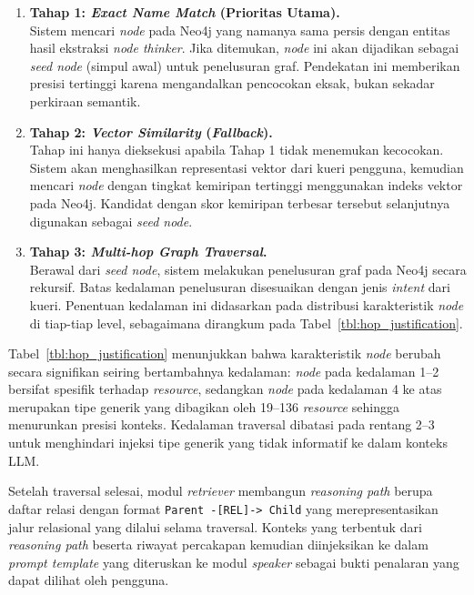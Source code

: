 \begin{enumerate}
    \item \textbf{Tahap 1: \textit{Exact Name Match} (Prioritas Utama).} \\
    Sistem mencari \textit{node} pada Neo4j yang namanya sama persis dengan entitas hasil ekstraksi 
    \textit{node thinker}. Jika ditemukan, \textit{node} ini akan dijadikan sebagai \textit{seed node} 
    (simpul awal) untuk penelusuran graf. Pendekatan ini memberikan presisi tertinggi karena 
    mengandalkan pencocokan eksak, bukan sekadar perkiraan semantik.

    \item \textbf{Tahap 2: \textit{Vector Similarity} (\textit{Fallback}).} \\
    Tahap ini hanya dieksekusi apabila Tahap 1 tidak menemukan kecocokan. Sistem akan menghasilkan 
    representasi vektor dari kueri pengguna, kemudian mencari \textit{node} dengan tingkat kemiripan 
    tertinggi menggunakan indeks vektor pada Neo4j. Kandidat dengan skor kemiripan terbesar tersebut 
    selanjutnya digunakan sebagai \textit{seed node}.

    \item \textbf{Tahap 3: \textit{Multi-hop Graph Traversal}.} \\
    Berawal dari \textit{seed node}, sistem melakukan penelusuran graf pada Neo4j secara rekursif. 
    Batas kedalaman penelusuran disesuaikan dengan jenis \textit{intent} dari kueri. Penentuan 
    kedalaman ini didasarkan pada distribusi karakteristik \textit{node} di tiap-tiap level, 
    sebagaimana dirangkum pada Tabel~\ref{tbl:hop_justification}.
\end{enumerate}



Tabel~\ref{tbl:hop_justification} menunjukkan bahwa karakteristik \textit{node} berubah secara
signifikan seiring bertambahnya kedalaman: \textit{node} pada kedalaman 1--2 bersifat spesifik
terhadap \textit{resource}, sedangkan \textit{node} pada kedalaman 4 ke atas merupakan tipe
generik yang dibagikan oleh 19--136 \textit{resource} sehingga menurunkan presisi konteks.
Kedalaman traversal dibatasi pada rentang 2--3 untuk menghindari injeksi tipe generik yang
tidak informatif ke dalam konteks LLM.

Setelah traversal selesai, modul \textit{retriever} membangun \textit{reasoning path} berupa
daftar relasi dengan format \texttt{Parent -[REL]-> Child} yang merepresentasikan jalur
relasional yang dilalui selama traversal.
Konteks yang terbentuk dari \textit{reasoning path} beserta riwayat percakapan kemudian
diinjeksikan ke dalam \textit{prompt template} yang diteruskan ke modul \textit{speaker}
sebagai bukti penalaran yang dapat dilihat oleh pengguna.

